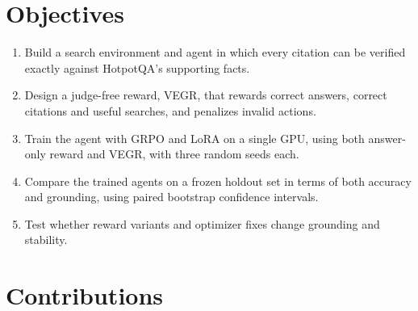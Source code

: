 \section{Objectives}\label{sec:1.4}

\begin{enumerate}
\def\labelenumi{\arabic{enumi}.}
\tightlist
\item
  Build a search environment and agent in which every citation can be
  verified exactly against HotpotQA's supporting facts.
\item
  Design a judge-free reward, VEGR, that rewards correct answers,
  correct citations and useful searches, and penalizes invalid actions.
\item
  Train the agent with GRPO and LoRA on a single GPU, using both
  answer-only reward and VEGR, with three random seeds each.
\item
  Compare the trained agents on a frozen holdout set in terms of both
  accuracy and grounding, using paired bootstrap confidence intervals.
\item
  Test whether reward variants and optimizer fixes change grounding and
  stability.
\end{enumerate}

\section{Contributions}\label{sec:1.5}

